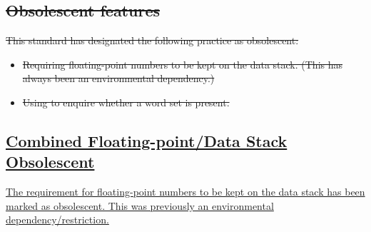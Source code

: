 \subsection[Obsolescent features]{\sout{Obsolescent features}} %
\label{diff:94:obsolete}

	\sout{This standard has designated the following practice as obsolescent:}

\begin{itemize}
\item \sout{Requiring floating-point numbers to be kept on the data stack.
	(This has always been an environmental dependency.)}

\item \sout{Using  to enquire whether a word set is present.}
\end{itemize}

\subsection[Combined Floating-point/Data Stack Obsolescent]{\uline{Combined Floating-point/Data Stack Obsolescent}} %
\label{diff:fpstack}

\uline{The requirement for floating-point numbers to be kept on the data stack
has been marked as obsolescent.  This was previously an environmental
dependency/restriction.}


